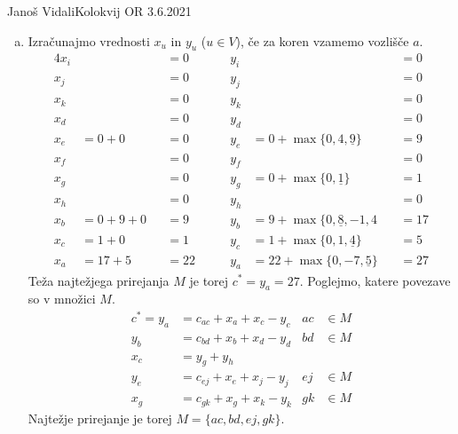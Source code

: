 \begin{naloga}{Janoš Vidali}{Kolokvij OR 3.6.2021}
\begin{odgovor}
\begin{enumerate}[(a)]
\item Izračunajmo vrednosti $x_u$ in $y_u$ ($u \in V$),
če za koren vzamemo vozlišče $a$.
\begin{alignat*}{4}
x_i &&&= 0 &\qquad y_i &&&= 0 \\
x_j &&&= 0 &\qquad y_j &&&= 0 \\
x_k &&&= 0 &\qquad y_k &&&= 0 \\
x_d &&&= 0 &\qquad y_d &&&= 0 \\
x_e &= 0+0 &&= 0 &\qquad
y_e &= 0 + \max\{0, 4, \underline{9}\} &&= 9 \\
x_f &&&= 0 &\qquad y_f &&&= 0 \\
x_g &&&= 0 &\qquad
y_g &= 0 + \max\{0, \underline{1}\} &&= 1 \\
x_h &&&= 0 &\qquad y_h &&&= 0 \\
x_b &= 0+9+0 &&= 9 &\qquad
y_b &= 9 + \max\{0, \underline{8}, -1, 4\ &&= 17 \\
x_c &= 1+0 &&= 1 &\qquad
y_c &= 1 + \max\{0, 1, \underline{4}\} &&= 5 \\
x_a &= 17+5 &&= 22 &\qquad
y_a &= 22 + \max\{0, -7, \underline{5}\} &&= 27
\end{alignat*}
Teža najtežjega prirejanja $M$ je torej $c^* = y_a = 27$.
Poglejmo, katere povezave so v množici $M$.
\begin{align*}
c^* = y_a &= c_{ac} + x_a + x_c - y_c & ac &\in M \\
y_b &= c_{bd} + x_b + x_d - y_d & bd &\in M \\
x_c &= y_g + y_h \\
y_e &= c_{ej} + x_e + x_j - y_j & ej &\in M \\
x_g &= c_{gk} + x_g + x_k - y_k & gk &\in M
\end{align*}
Najtežje prirejanje je torej $M = \{ac, bd, ej, gk\}$.
\end{enumerate}
\end{odgovor}
\end{naloga}
